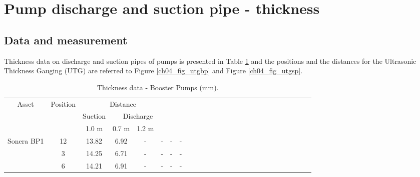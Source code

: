 %
\section{Pump discharge and suction pipe - thickness} \label{ch04mech01}
\subsection{Data and measurement}
Thickness data on discharge and suction pipes of pumps is presented in Table \ref{ch04_tbl_thickness02} and the positions and the distances for the Ultrasonic Thickness Gauging (UTG) are referred to Figure \ref{ch04_fig_utgbp} and Figure \ref{ch04_fig_utgsp}.


\begin{table}[h]
	\caption{Thickness data - Booster Pumps (mm).}
	\label{ch04_tbl_thickness02}
	{\footnotesize
		\begin{tabular}{l|l|l|l|l|l|l|lllllllllllllllllll}
			\cline{1-8}
			\multicolumn{1}{c|}{Asset} & \multicolumn{1}{c|}{Position} & \multicolumn{4}{c}{Distance} & \multicolumn{1}{c}{} & \multicolumn{1}{c}{} &  &  &  &  &  &  &  &  &  &  &  &  &  &  &  &  &  &  \\ 
			\cline{3-8}
			\multicolumn{1}{c|}{} & \multicolumn{1}{c|}{} & \multicolumn{1}{c|}{Suction} & \multicolumn{3}{c}{Discharge} & \multicolumn{1}{c}{} & \multicolumn{1}{c}{} &  &  &  &  &  &  &  &  &  &  &  &  &  &  &  &  &  &  \\ 
			\cline{1-8}
			\multicolumn{1}{c|}{} & \multicolumn{1}{c|}{} & \multicolumn{1}{c|}{1.0 m} & \multicolumn{1}{c|}{0.7 m} & \multicolumn{1}{c|}{1.2 m} & \multicolumn{1}{c|}{} & \multicolumn{1}{c|}{} & \multicolumn{1}{c}{} &  &  &  &  &  &  &  &  &  &  &  &  &  &  &  &  &  &  \\ 
			\cline{1-8}
			\multicolumn{1}{c|}{Sonera BP1} & \multicolumn{1}{c|}{12} & \multicolumn{1}{c|}{13.82} & \multicolumn{1}{c|}{6.92} & \multicolumn{1}{c|}{-} & \multicolumn{1}{c|}{-} & \multicolumn{1}{c|}{-} & \multicolumn{1}{c}{-} &  &  &  &  &  &  &  &  &  &  &  &  &  &  &  &  &  &  \\ 
			\multicolumn{1}{c|}{} & \multicolumn{1}{c|}{3} & \multicolumn{1}{c|}{14.25} & \multicolumn{1}{c|}{6.71} & \multicolumn{1}{c|}{-} & \multicolumn{1}{c|}{-} & \multicolumn{1}{c|}{-} & \multicolumn{1}{c}{-} &  &  &  &  &  &  &  &  &  &  &  &  &  &  &  &  &  &  \\ 
			\multicolumn{1}{c|}{} & \multicolumn{1}{c|}{6} & \multicolumn{1}{c|}{14.21} & \multicolumn{1}{c|}{6.91} & \multicolumn{1}{c|}{-} & \multicolumn{1}{c|}{-} & \multicolumn{1}{c|}{-} & \multicolumn{1}{c}{-} &  &  &  &  &  &  &  &  &  &  &  &  &  &  &  &  &  &  \\ 

\end{tabular}}
\end{table}
